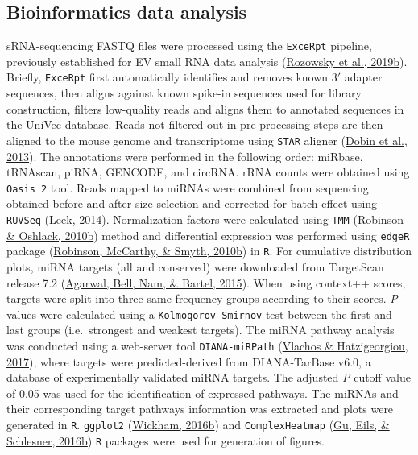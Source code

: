 \documentclass[12pt,twoside]{reedthesis}
\begin{document}
\hypertarget{bioinformatics-data-analysis}{%
\subsection{Bioinformatics data analysis}\label{bioinformatics-data-analysis}}

sRNA-sequencing FASTQ files were processed using the \texttt{ExceRpt} pipeline,
previously established for EV small RNA data analysis (\protect\hyperlink{ref-rozowsky_2019}{Rozowsky et al., 2019b}).
Briefly, \texttt{ExceRpt} first automatically identifies and removes known 3\('\)
adapter sequences, then aligns against known spike-in sequences used for
library construction, filters low-quality reads and aligns them to
annotated sequences in the UniVec database. Reads not filtered out in
pre-processing steps are then aligned to the mouse genome and
transcriptome using \texttt{STAR} aligner (\protect\hyperlink{ref-dobin_2013}{Dobin et al., 2013}). The annotations were
performed in the following order: miRbase, tRNAscan, piRNA, GENCODE, and
circRNA. rRNA counts were obtained using \texttt{Oasis\ 2} tool. Reads mapped to
miRNAs were combined from sequencing obtained before and after
size-selection and corrected for batch effect using \texttt{RUVSeq}
(\protect\hyperlink{ref-leek_2014}{Leek, 2014}). Normalization factors were calculated using \texttt{TMM}
(\protect\hyperlink{ref-robinson_2010}{Robinson \& Oshlack, 2010b}) method and differential expression was performed using
\texttt{edgeR} package (\protect\hyperlink{ref-robinson_2010a}{Robinson, McCarthy, \& Smyth, 2010b}) in \texttt{R}. For cumulative distribution
plots, miRNA targets (all and conserved) were downloaded from TargetScan
release 7.2 (\protect\hyperlink{ref-agarwal_2015}{Agarwal, Bell, Nam, \& Bartel, 2015}). When using context++ scores, targets were
split into three same-frequency groups according to their scores.
\textit{P}-values were calculated using a \texttt{Kolmogorov–Smirnov} test
between the first and last groups (i.e.~strongest and weakest targets).
The miRNA pathway analysis was conducted using a web-server tool
\texttt{DIANA-miRPath} (\protect\hyperlink{ref-vlachos_2017}{Vlachos \& Hatzigeorgiou, 2017}), where targets were predicted-derived
from DIANA-TarBase v6.0, a database of experimentally validated miRNA
targets. The adjusted \textit{P} cutoff value of 0.05 was used for the
identification of expressed pathways. The miRNAs and their corresponding
target pathways information was extracted and plots were generated in
\texttt{R}. \texttt{ggplot2} (\protect\hyperlink{ref-wickham_2016}{Wickham, 2016b}) and \texttt{ComplexHeatmap} (\protect\hyperlink{ref-gu_2016}{Gu, Eils, \& Schlesner, 2016b}) \texttt{R}
packages were used for generation of figures.
\end{document}
